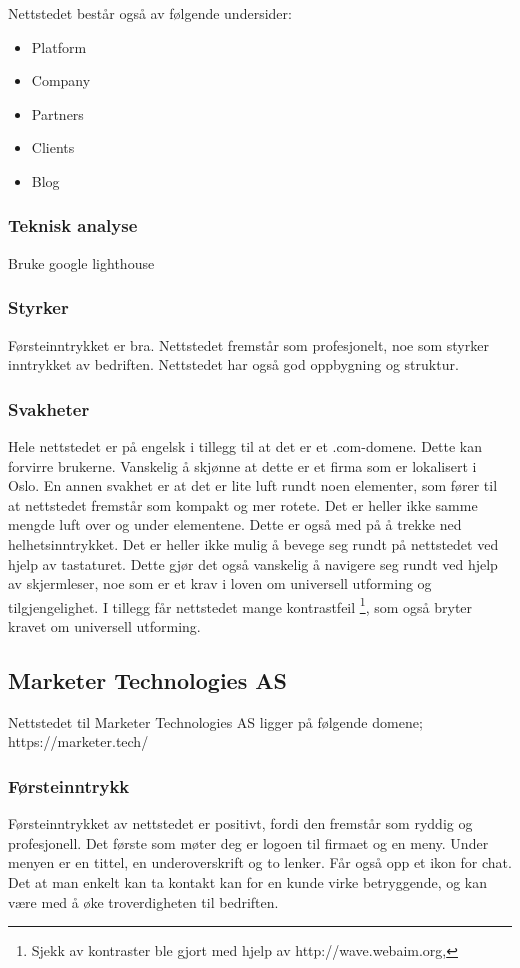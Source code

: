 Nettstedet består også av følgende undersider:
\begin{itemize}
\item Platform
\item Company
\item Partners
\item Clients
\item Blog
\end{itemize}

\subsubsection{Teknisk analyse}
Bruke google lighthouse



\subsubsection{Styrker}
Førsteinntrykket er bra. Nettstedet fremstår som profesjonelt, noe som styrker inntrykket av bedriften. Nettstedet har også god oppbygning og struktur. 

\subsubsection{Svakheter}
Hele nettstedet er på engelsk i tillegg til at det er et .com-domene. Dette kan forvirre brukerne. Vanskelig å skjønne at dette er et firma som er lokalisert i Oslo. En annen svakhet er at det er lite luft rundt noen elementer, som fører til at nettstedet fremstår som kompakt og mer rotete. Det er heller ikke samme mengde luft over og under elementene. Dette er også med på å trekke ned helhetsinntrykket. Det er heller ikke mulig å bevege seg rundt på nettstedet ved hjelp av tastaturet. Dette gjør det også vanskelig å navigere seg rundt ved hjelp av skjermleser, noe som er et krav i loven om universell utforming og tilgjengelighet. I tillegg får nettstedet mange kontrastfeil \footnote{Sjekk av kontraster ble gjort med hjelp av http://wave.webaim.org,}, som også bryter kravet om universell utforming.

\subsection{Marketer Technologies AS}
Nettstedet til Marketer Technologies AS ligger på følgende domene;
https://marketer.tech/

\subsubsection{Førsteinntrykk}
Førsteinntrykket av nettstedet er positivt, fordi den fremstår som ryddig og profesjonell. Det første som møter deg er logoen til firmaet og en meny. Under menyen er en tittel, en underoverskrift og to lenker. Får også opp et ikon for chat. Det at man enkelt kan ta kontakt kan for en kunde virke betryggende, og kan være med å øke troverdigheten til bedriften.


